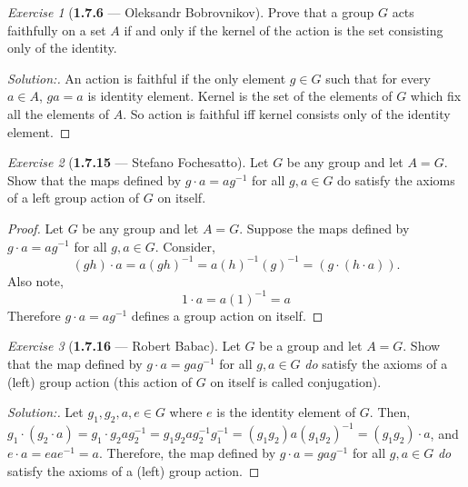 \documentclass[12pt]{amsart}
\theoremstyle{remark}
\newtheorem*{exercise}{Exercise}%
\theoremstyle{mycomment}
\begin{document}
\begin{exercise}[\textbf{1.7.6} --- Oleksandr Bobrovnikov]
  Prove that a group $G$ acts faithfully on a set $A$ if and only if the kernel of the action is the set consisting only of the identity.
  \begin{proof}[Solution:]
    An action is faithful if the only element $g\in G$ such that for every $a\in A$, $ga=a$ is identity element.
    Kernel is the set of the elements of $G$ which fix all the elements of $A$. So action is faithful iff kernel consists only of the identity element.
  \end{proof}
\end{exercise}
\vspace{.15in}



\begin{exercise}[\textbf{1.7.15} --- Stefano Fochesatto] Let $G$ be any group and let $A = G$. Show that the maps defined by $g \cdot a = ag^{-1}$ for all $g, a \in G$
  do satisfy the axioms of a left group action of $G$ on itself.\\
  \begin{proof} Let $G$ be any group and let $A = G$. Suppose the maps defined by $g \cdot a = ag^{-1}$ for all $g, a \in G$. Consider,
    \begin{equation*}
      (gh) \cdot a = a(gh)^{-1} = a(h)^{-1}(g)^{-1} = (g\cdot(h \cdot a)). 
    \end{equation*}
    Also note, 
    \begin{equation*}
      1 \cdot a = a (1)^{-1} = a
    \end{equation*}
    Therefore $g \cdot a = ag^{-1}$  defines a group action on itself.  
  \end{proof}
\end{exercise}
\vspace{.15in}



\begin{exercise}[\textbf{1.7.16} --- Robert Babac]  
  Let $G$ be a group and let $A=G$. Show that the map defined by $g\cdot a=gag^{-1}$ for all $g,a\in G$ \textit{do} satisfy the axioms of a (left) group action (this action of $G$ on itself is called conjugation).
  \begin{proof}[Solution:]
  Let $g_1,g_2,a,e\in G$ where $e$ is the identity element of $G$. Then, $g_1\cdot (g_2\cdot a)=g_1\cdot g_2ag_2^{-1}=g_1g_2ag_2^{-1}g_1^{-1}=(g_1g_2)a(g_1g_2)^{-1}=(g_1g_2)\cdot a$, and $e\cdot a=eae^{-1}=a$. Therefore, the map defined by $g\cdot a=gag^{-1}$ for all $g,a\in G$ \textit{do} satisfy the axioms of a (left) group action.
  \end{proof}
  \end{exercise}
  \vspace{.15in}
\end{document}
